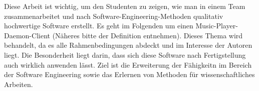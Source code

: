 Diese Arbeit ist wichtig, um den Studenten zu zeigen, wie man in einem Team zusammenarbeitet und nach Software-Engineering-Methoden qualitativ hochwertige Software erstellt. Es geht im Folgenden um einen Music-Player-Daemon-Client (Näheres bitte der Definition entnehmen). Dieses Thema wird behandelt, da es alle Rahmenbedingungen abdeckt und im Interesse der Autoren liegt. Die Besonderheit liegt darin, dass sich diese Software nach Fertigstellung auch wirklich anwenden lässt. Ziel ist die Erweiterung der Fähigkeitn im Bereich der Software Engineering sowie das Erlernen von Methoden für wissenschaftliches Arbeiten.



